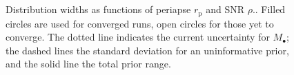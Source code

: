 \documentclass[11pt,twoside]{article}
\begin{document}
\begin{figure}
\begin{center}
 \quad
{} \\
 \quad
{} \\
\caption{Distribution widths as functions of periapse $r_\mathrm{p}$ and SNR $\rho$.. Filled circles are used for converged runs, open circles for those yet to converge. The dotted line indicates the current uncertainty for $M_\bullet$; the dashed lines the standard deviation for an uninformative prior, and the solid line the total prior range.}
\label{fig:sigmas}
\end{center}
\end{figure}
\end{document}
